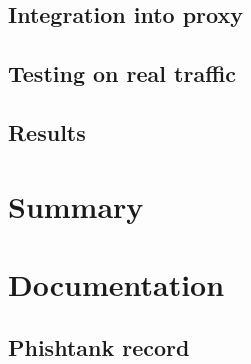 \documentclass[
  digital, %
  oneside, %
  table,   %
  nolof,     %
  nolot,     %
]{fithesis3}
\begin{document}
\section{Integration into proxy}

\section{Testing on real traffic}

\section{Results}

\chapter{Summary}



\shorthandon{-}


\printbibliography[heading=bibintoc] %

\appendix
\chapter{Documentation}

\section{Phishtank record}
\label{appendix:phishtank_record}
\end{document}
